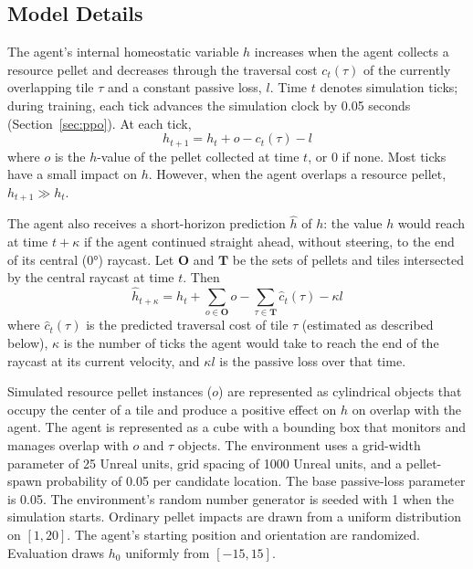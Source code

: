 \documentclass[12pt,fleqn]{article}
\begin{document}
\subsection{Model Details}\label{sec:model}

The agent's internal homeostatic variable \(h\) increases when the agent collects a resource pellet and decreases through the traversal cost \(c_t(\tau)\) of the currently overlapping tile \(\tau\) and a constant passive loss, \(l\). Time \(t\) denotes simulation ticks; during training, each tick advances the simulation clock by 0.05 seconds (Section~\ref{sec:ppo}). At each tick,
\begin{equation}\label{eq:h}
  h_{t+1} = h_t + o - c_t(\tau) - l
\end{equation}
where \(o\) is the \(h\)-value of the pellet collected at time \(t\), or 0 if none. Most ticks have a small impact on \(h\). However, when the agent overlaps a resource pellet, \(h_{t+1} \gg h_t\).

The agent also receives a short-horizon prediction \(\hat{h}\) of \(h\): the value \(h\) would reach at time \(t+\kappa\) if the agent continued straight ahead, without steering, to the end of its central (0°) raycast. Let \(\mathbf{O}\) and \(\mathbf{T}\) be the sets of pellets and tiles intersected by the central raycast at time \(t\). Then
\begin{equation}\label{eq:h-hat}
  \hat{h}_{t+\kappa} = h_t + \sum_{o \in \mathbf{O}} o - \sum_{\tau \in \mathbf{T}} \hat{c}_t(\tau) - \kappa l
\end{equation}
where \(\hat{c}_t(\tau)\) is the predicted traversal cost of tile \(\tau\) (estimated as described below), \(\kappa\) is the number of ticks the agent would take to reach the end of the raycast at its current velocity, and \(\kappa l\) is the passive loss over that time.

Simulated resource pellet instances (\(o\)) are represented as cylindrical objects that occupy the center of a tile and produce a positive effect on \(h\) on overlap with the agent. The agent is represented as a cube with a bounding box that monitors and manages overlap with \(o\) and \(\tau\) objects. The environment uses a grid-width parameter of 25 Unreal units, grid spacing of 1000 Unreal units, and a pellet-spawn probability of 0.05 per candidate location. The base passive-loss parameter is 0.05. The environment's random number generator is seeded with 1 when the simulation starts. Ordinary pellet impacts are drawn from a uniform distribution on $[1,20]$. The agent's starting position and orientation are randomized. Evaluation draws $h_0$ uniformly from $[-15,15]$. 
\end{document}

